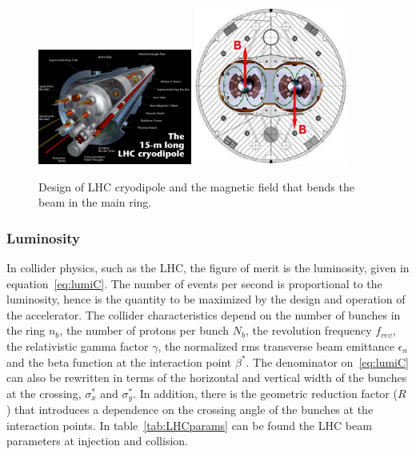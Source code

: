 \begin{figure}[!Hhtbp]
  \begin{center}
    \includegraphics[width=0.45\textwidth]{figs/cryodipole.jpg}
    \includegraphics[width=0.45\textwidth]{figs/dipole_B.jpg}
    \caption{Design of LHC cryodipole and the magnetic field that bends the beam in the main ring.}
    \label{fig:dipole}
  \end{center}
\end{figure}

\subsubsection{Luminosity}
\label{sec:lumi}

In collider physics, such as the LHC, the figure of merit is the luminosity, given in equation~\ref{eq:lumiC}. The number of events per second is proportional to the luminosity, hence is the quantity to be maximized by the design and operation of the accelerator. The collider characteristics depend on the number of bunches in the ring $n_{b}$, the number of protons per bunch $N_{b}$, the revolution frequency $f_{rev}$, the relativistic gamma factor $\gamma$, the normalized rms transverse beam emittance $\epsilon_{n}$ and the beta function at the interaction point $\beta^{*}$. The denominator on~\ref{eq:lumiC} can also be rewritten in terms of the horizontal and vertical width of the bunches at the crossing, $\sigma^{*}_{x}$ and $\sigma^{*}_{y}$. In addition, there is the geometric reduction factor ($R$) that introduces a dependence on the crossing angle of the bunches at the interaction points. In table~\ref{tab:LHCparams} can be found the LHC beam parameters at injection and collision.  

